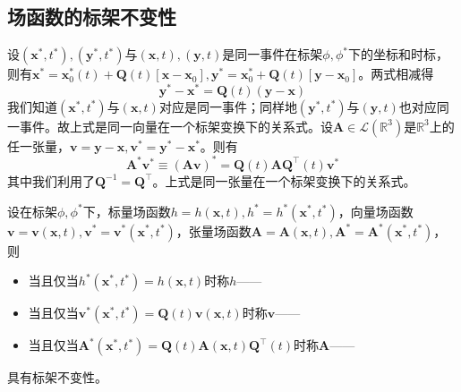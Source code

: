 \documentclass[main.tex]{subfiles}
\begin{document}
\subsection{场函数的标架不变性}
设$\left(\mathbf{x}^*,t^*\right),\left(\mathbf{y}^*,t^*\right)$与$\left(\mathbf{x},t\right),\left(\mathbf{y},t\right)$是同一事件在标架$\phi,\phi^*$下的坐标和时标，则有$\mathbf{x}^*=\mathbf{x}_0^*\left(t\right)+\mathbf{Q}\left(t\right)\left[\mathbf{x}-\mathbf{x}_0\right],\mathbf{y}^*=\mathbf{x}_0^*+\mathbf{Q}\left(t\right)\left[\mathbf{y}-\mathbf{x}_0\right]$。两式相减得
\[\mathbf{y}^*-\mathbf{x}^*=\mathbf{Q}\left(t\right)\left(\mathbf{y}-\mathbf{x}\right)\]
我们知道$\left(\mathbf{x}^*,t^*\right)$与$\left(\mathbf{x},t\right)$对应是同一事件；同样地$\left(\mathbf{y}^*,t^*\right)$与$\left(\mathbf{y},t\right)$也对应同一事件。故上式是同一向量在一个标架变换下的关系式。设$\mathbf{A}\in\mathcal{L}\left(\mathbb{R}^3\right)$是$\mathbb{R}^3$上的任一张量，$\mathbf{v}=\mathbf{y}-\mathbf{x},\mathbf{v}^*=\mathbf{y}^*-\mathbf{x}^*$。则有
\[\mathbf{A}^*\mathbf{v}^*\equiv\left(\mathbf{Av}\right)^*=\mathbf{Q}\left(t\right)\mathbf{AQ}^\intercal\left(t\right)\mathbf{v}^*
\]
其中我们利用了$\mathbf{Q}^{-1}=\mathbf{Q}^\intercal$。上式是同一张量在一个标架变换下的关系式。

设在标架$\phi,\phi^*$下，标量场函数$h=h\left(\mathbf{x},t\right),h^*=h^*\left(\mathbf{x}^*,t^*\right)$，向量场函数$\mathbf{v}=\mathbf{v}\left(\mathbf{x},t\right),\mathbf{v}^*=\mathbf{v}^*\left(\mathbf{x}^*,t^*\right)$，张量场函数$\mathbf{A}=\mathbf{A}\left(\mathbf{x},t\right),\mathbf{A}^*=\mathbf{A}^*\left(\mathbf{x}^*,t^*\right)$，则
\begin{itemize}
    \item 当且仅当$h^*\left(\mathbf{x}^*,t^*\right)=h\left(\mathbf{x},t\right)$时称$h$——
    \item 当且仅当$\mathbf{v}^*\left(\mathbf{x}^*,t^*\right)=\mathbf{Q}\left(t\right)\mathbf{v}\left(\mathbf{x},t\right)$时称$\mathbf{v}$——
    \item 当且仅当$\mathbf{A}^*\left(\mathbf{x}^*,t^*\right)=\mathbf{Q}\left(t\right)\mathbf{A}\left(\mathbf{x},t\right)\mathbf{Q}^\intercal\left(t\right)$时称$\mathbf{A}$——
\end{itemize}
具有标架不变性。
\end{document}
